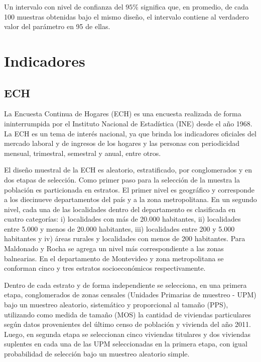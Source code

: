 \documentclass[12pt,twoside,spanish,a4paper]{book}\usepackage[]{graphicx}\usepackage[]{color}
\begin{document}
Un intervalo con nivel de confianza del $95\%$ significa que, en promedio, de cada 100 muestras obtenidas bajo el mismo diseño, el intervalo contiene al verdadero valor del parámetro en 95 de ellas.

\chapter{Indicadores \label{cap:ind}}

\section{ECH \label{sec:ech}}

La Encuesta Continua de Hogares (ECH) es una encuesta realizada de forma ininterrumpida por el Instituto Nacional de Estadística (INE) desde el año 1968.  La ECH es un tema de interés nacional, ya que brinda los indicadores oficiales del mercado laboral y de ingresos de los hogares y las personas con periodicidad mensual, trimestral, semestral y anual, entre otros.

El diseño muestral de la ECH es aleatorio, estratificado, por conglomerados y en dos etapas de selección. Como primer paso para la selección de la muestra la población es particionada en estratos. El primer nivel es geográfico y corresponde a los diecinueve departamentos del país y a la zona metropolitana. En un segundo nivel, cada una de las localidades dentro del departamento es clasificada en cuatro categorías: i) localidades con más de 20.000 habitantes, ii) localidades entre 5.000 y menos de 20.000 habitantes, iii) localidades entre 200 y 5.000 habitantes y iv) áreas rurales y localidades con menos de 200 habitantes. Para Maldonado y Rocha se agrega un nivel más correspondiente a las zonas balnearias. En el departamento de Montevideo y zona metropolitana se conforman cinco y tres estratos socioeconómicos respectivamente.

Dentro de cada estrato y de forma independiente se selecciona, en una primera etapa, conglomerados de zonas censales (Unidades Primarias de muestreo - UPM) bajo un muestreo aleatorio, sistemático y proporcional al tamaño (PPS), utilizando como medida de tamaño (MOS) la cantidad de viviendas particulares según datos provenientes del último censo de población y vivienda del año 2011. Luego, en segunda etapa se seleccionan cinco viviendas titulares y dos viviendas suplentes en cada una de las UPM seleccionadas en la primera etapa, con igual probabilidad de selección bajo un muestreo aleatorio simple.
\end{document}
